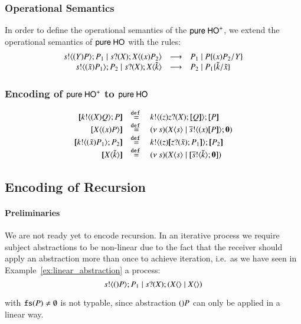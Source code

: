 \subsubsection{Operational Semantics}
In order to define the operational semantics of the $\mathsf{pure\ HO}^+$,
we extend the operational semantics of $\mathsf{pure\ HO}$ with the rules:
%
\[
	\begin{array}{rcl}
		s ! \langle (Y)P \rangle ; P_1 \;|\; s ? (X) ; X\langle (x)P_2 \rangle &\longrightarrow& P_1 \;|\; P \{(x)P_2/Y \}\\
		s ! \langle (\tilde{x})P_1 \rangle ; P_2 \;|\; s ? (X) ; X\langle \tilde{k} \rangle &\longrightarrow& P_2 \;|\; P_1\{\tilde{k}/\tilde{x} \}
	\end{array}
\]
%
\subsubsection{Encoding of $\mathsf{pure\ HO}^+$ to $\mathsf{pure\ HO}$}
%
\[
	\begin{array}{rcl}
		\map{\bout{k}{\abs{\X} Q} P}	&\defeq&	\bout{k}{\abs{z} \binp{z}{\X} \map{Q}} \map{P}\\
		\map{\appl{X}{\abs{x} P}}	&\defeq&	\newsp{s}{\appl{X}{s} \Par \bout{\dual{s}}{\abs{x}{\map{P}}} \inact}\\

		\map{\bout{k}{\abs{\tilde{x}}{P_1}} P_2}	&\defeq&	\bout{k}{ \abs{z}{ \map{ \binp{z}{\tilde{x}} P_1} } } \map{P_2}\\
		\map{\appl{\X}{\tilde{k}}}			&\defeq&	\newsp{s}{\appl{\X}{s} \Par \map{\bout{\dual{s}}{\tilde{k}} \inact}}\\
	\end{array}
\]

\subsection{Encoding of Recursion \label{ss:encrec}}
\paragraph{Preliminaries}
We are not ready yet to encode recursion. In an iterative process we require
subject abstractions to be non-linear due to the fact that the receiver should
apply an abstraction more than once to achieve iteration,
i.e.~as we have seen in Example~\ref{ex:linear_abstraction} a process:
\[
	s ! \langle ()P \rangle ; P_1 \;|\; s ? (X) ; (X\langle  \rangle \;|\; X\langle  \rangle)
\]

with $\mathtt{fs}(P) \not= \emptyset$ is not typable, since abstraction $()P$
can only be applied in a linear way.

